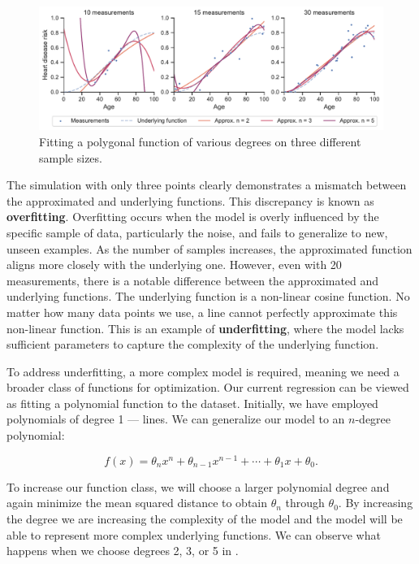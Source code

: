 \begin{figure}[h]
 \centering
 \includegraphics[width=\columnwidth]{images/3/heart_disease_risk_samples_degrees}
 \caption{Fitting a polygonal function of various degrees on three different sample sizes.}
 \label{fig:reg-deg-2}
\end{figure}

The simulation with only three points clearly demonstrates a mismatch between the approximated and underlying functions. This discrepancy is known as \textbf{overfitting}. Overfitting occurs when the model is overly influenced by the specific sample of data, particularly the noise, and fails to generalize to new, unseen examples. As the number of samples increases, the approximated function aligns more closely with the underlying one. However, even with 20 measurements, there is a notable difference between the approximated and underlying functions. The underlying function is a non-linear cosine function. No matter how many data points we use, a line cannot perfectly approximate this non-linear function. This is an example of \textbf{underfitting}, where the model lacks sufficient parameters to capture the complexity of the underlying function.

To address underfitting, a more complex model is required, meaning we need a broader class of functions for optimization. Our current regression can be viewed as fitting a polynomial function to the dataset. Initially, we have employed polynomials of degree 1 — lines. We can generalize our model to an $n$-degree polynomial:

\begin{equation}
	f(x) = \theta_n x^n + \theta_{n-1}x^{n-1} + \cdots + \theta_1 x + \theta_0.
\end{equation}

To increase our function class, we will choose a larger polynomial degree and again minimize the mean squared distance to obtain $\theta_n$ through $\theta_0$. By increasing the degree we are increasing the complexity of the model and the model will be able to represent more complex underlying functions. We can observe what happens when we choose degrees 2, 3, or 5 in .

